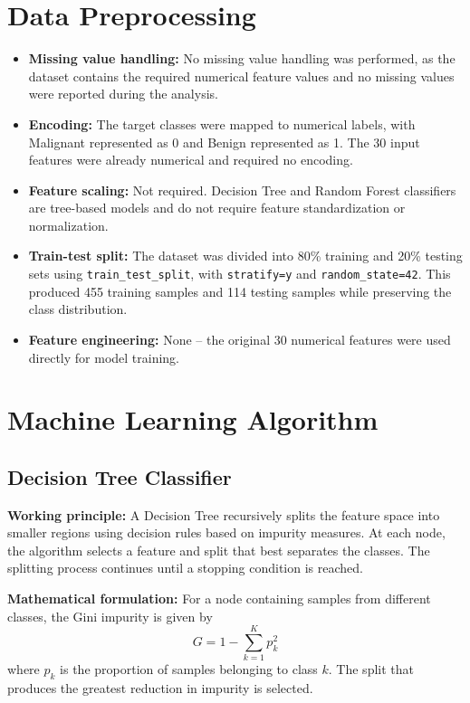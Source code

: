 \documentclass[12pt,a4paper]{article}
\begin{document}
\section{Data Preprocessing}
\begin{itemize}
\item \textbf{Missing value handling:} No missing value handling was performed, as the dataset contains the required numerical feature values and no missing values were reported during the analysis.

\item \textbf{Encoding:} The target classes were mapped to numerical labels, with Malignant represented as 0 and Benign represented as 1. The 30 input features were already numerical and required no encoding.

\item \textbf{Feature scaling:} Not required. Decision Tree and Random Forest classifiers are tree-based models and do not require feature standardization or normalization.

\item \textbf{Train-test split:} The dataset was divided into 80\% training and 20\% testing sets using \texttt{train\_test\_split}, with \texttt{stratify=y} and \texttt{random\_state=42}. This produced 455 training samples and 114 testing samples while preserving the class distribution.

\item \textbf{Feature engineering:} None -- the original 30 numerical features were used directly for model training.
\end{itemize}

\section{Machine Learning Algorithm}

\subsection*{Decision Tree Classifier}

\textbf{Working principle:} A Decision Tree recursively splits the feature space into smaller regions using decision rules based on impurity measures. At each node, the algorithm selects a feature and split that best separates the classes. The splitting process continues until a stopping condition is reached.

\textbf{Mathematical formulation:}
For a node containing samples from different classes, the Gini impurity is given by
\[
G = 1-\sum_{k=1}^{K}p_k^2
\]
where $p_k$ is the proportion of samples belonging to class $k$. The split that produces the greatest reduction in impurity is selected.
\end{document}
